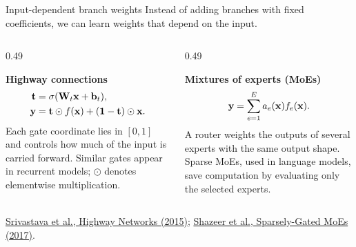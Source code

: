 \documentclass[12pt,aspectratio=169]{beamer}
\begin{document}
\begin{frame}{Input-dependent branch weights}
	\small
	\setlength{\parskip}{3pt}
	\setlength{\abovedisplayskip}{5pt}
	\setlength{\belowdisplayskip}{5pt}
	Instead of adding branches with fixed coefficients, we can learn weights
	that depend on the input.

	\begin{columns}[T,onlytextwidth]
		\begin{column}{0.49\textwidth}
			\begin{tcolorbox}[nndsblue,height=5.05cm,boxsep=2pt,left=5pt,right=5pt,top=5pt,bottom=5pt]
				\footnotesize\RaggedRight
				\setlength{\parskip}{3pt}
				\setlength{\abovedisplayskip}{5pt}
				\setlength{\belowdisplayskip}{5pt}
				\textbf{Highway connections}
				\begin{align*}
					\boldsymbol{\mathbf{t}} & = \sigma(\boldsymbol{\mathbf{W}}_t\boldsymbol{\mathbf{x}}+\boldsymbol{\mathbf{b}}_t), \\
					\boldsymbol{\mathbf{y}} & = \boldsymbol{\mathbf{t}}\odot f(\boldsymbol{\mathbf{x}})
					+(\boldsymbol{\mathbf{1}}-\boldsymbol{\mathbf{t}})\odot\boldsymbol{\mathbf{x}}.
				\end{align*}
				Each gate coordinate lies in $[0,1]$ and controls how much of the
				input is carried forward. Similar gates appear in recurrent models;
				$\odot$ denotes elementwise multiplication.
			\end{tcolorbox}
		\end{column}
		\begin{column}{0.49\textwidth}
			\begin{tcolorbox}[nndsgreen,height=5.05cm,boxsep=2pt,left=5pt,right=5pt,top=5pt,bottom=5pt]
				\footnotesize\RaggedRight
				\setlength{\parskip}{3pt}
				\setlength{\abovedisplayskip}{5pt}
				\setlength{\belowdisplayskip}{5pt}
				\textbf{Mixtures of experts (MoEs)}
				\[
					\boldsymbol{\mathbf{y}}=\sum_{e=1}^{E}a_e(\boldsymbol{\mathbf{x}})f_e(\boldsymbol{\mathbf{x}}).
				\]
				A router weights the outputs of several experts with the same
				output shape. Sparse MoEs, used in language models, save computation
				by evaluating only the selected experts.
			\end{tcolorbox}
		\end{column}
	\end{columns}

	\vfill
	{\tiny\color{drawgray}
		\href{https://arxiv.org/abs/1505.00387}{Srivastava et al., Highway Networks (2015)};
		\href{https://arxiv.org/abs/1701.06538}{Shazeer et al., Sparsely-Gated MoEs (2017)}.\par}
\end{frame}
\end{document}
